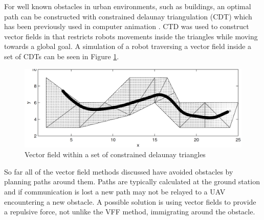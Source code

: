 \documentclass[numbered,pdftex]{ohio-etd}
\begin{document}
For well known obstacles in urban environments, such as buildings, an optimal path can be constructed with constrained delaunay triangulation (CDT) which has been previously used in computer animation \cite{md_simplex_2017}. CTD was used to construct vector fields in \cite{pimenta_fully_2007} that restricts robots movements inside the triangles while moving towards a global goal. A simulation of a robot traversing a vector field inside a set of CDTs can be seen in Figure \ref{fig:cdtVF}.

\begin{figure}
	\centering
	\includegraphics[width=15cm]{PaperFigures/cdtVF}
	\caption{Vector field within a set of constrained delaunay triangles \cite{pimenta_fully_2007}}
	\label{fig:cdtVF}
\end{figure}


So far all of the vector field methods discussed have avoided obstacles by planning paths around them. Paths are typically calculated at the ground station and if communication is lost a new path may not be relayed to a UAV encountering a new obstacle. A possible solution is using vector fields to provide a repulsive force, not unlike the VFF method, immigrating around the obstacle. 



\end{document}
